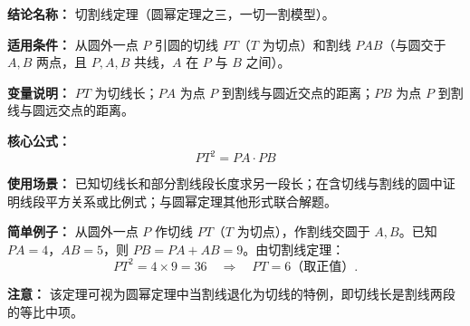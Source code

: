 \textbf{结论名称：} 切割线定理（圆幂定理之三，一切一割模型）。

\textbf{适用条件：} 从圆外一点 \(P\) 引圆的切线 \(PT\)（\(T\) 为切点）和割线 \(PAB\)（与圆交于 \(A,B\) 两点，且 \(P,A,B\) 共线，\(A\) 在 \(P\) 与 \(B\) 之间）。

\textbf{变量说明：} \(PT\) 为切线长；\(PA\) 为点 \(P\) 到割线与圆近交点的距离；\(PB\) 为点 \(P\) 到割线与圆远交点的距离。

\textbf{核心公式：}
\[
\boxed{PT^{2} = PA \cdot PB}
\]

\textbf{使用场景：} 已知切线长和部分割线段长度求另一段长；在含切线与割线的圆中证明线段平方关系或比例式；与圆幂定理其他形式联合解题。

\textbf{简单例子：} 从圆外一点 \(P\) 作切线 \(PT\)（\(T\) 为切点），作割线交圆于 \(A,B\)。已知 \(PA=4\)，\(AB=5\)，则 \(PB=PA+AB=9\)。由切割线定理：
\[
PT^{2}=4 \times 9=36 \quad\Rightarrow\quad PT=6 \text{（取正值）}.
\]

\textbf{注意：} 该定理可视为圆幂定理中当割线退化为切线的特例，即切线长是割线两段的等比中项。